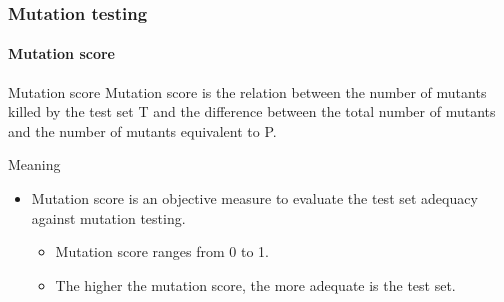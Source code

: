 \begin{frame}[hasprev=true, hasnext=false]
\frametitle{Mutation testing}
\framesubtitle{Mutation score}
\label{concept:mutation-score}

\begin{block:concept}{Mutation score}
Mutation score is the relation between the number of mutants killed by the
test set T and the difference between the total number of mutants and the
number of mutants equivalent to P.
\end{block:concept}

\begin{block:fact}{Meaning}
\begin{itemize}
	\item Mutation score is an objective measure to evaluate the test set
	adequacy against mutation testing.
	\begin{itemize}
		\item Mutation score ranges from 0 to 1.

		\item The higher the mutation score, the more adequate is the test set.
	\end{itemize}
\end{itemize}
\end{block:fact}
\end{frame}
